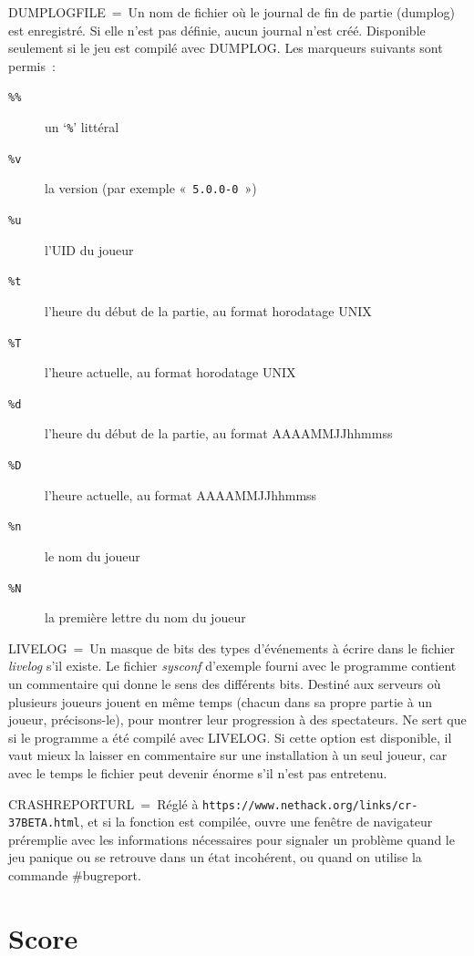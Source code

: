 \documentclass[titlepage]{article}
\begin{document}
DUMPLOGFILE~=~Un nom de fichier où le journal de fin de partie
(dumplog) est enregistré.
Si elle n'est pas définie, aucun journal n'est créé.
Disponible seulement si le jeu est compilé avec DUMPLOG.
Les marqueurs suivants sont permis~:
\begin{description}
\item[{\texttt{\%\%}}]
un `\texttt{\%}' littéral
\item[{\texttt{\%v}}]
la version (par exemple «~\texttt{5.0.0-0}~»)
\item[{\texttt{\%u}}]
l'UID du joueur
\item[{\texttt{\%t}}]
l'heure du début de la partie, au format horodatage UNIX
\item[{\texttt{\%T}}]
l'heure actuelle, au format horodatage UNIX
\item[{\texttt{\%d}}]
l'heure du début de la partie, au format AAAAMMJJhhmmss
\item[{\texttt{\%D}}]
l'heure actuelle, au format AAAAMMJJhhmmss
\item[{\texttt{\%n}}]
le nom du joueur
\item[{\texttt{\%N}}]
la première lettre du nom du joueur
\end{description}


LIVELOG~=~Un masque de bits des types d'événements à écrire dans le
fichier \textit{livelog} s'il existe.
Le fichier \textit{sysconf} d'exemple fourni avec le programme contient un
commentaire qui donne le sens des différents bits.
Destiné aux serveurs où plusieurs joueurs jouent en même temps (chacun
dans sa propre partie à un joueur, précisons-le), pour montrer leur
progression à des spectateurs.
Ne sert que si le programme a été compilé avec LIVELOG.
Si cette option est disponible, il vaut mieux la laisser en commentaire
sur une installation à un seul joueur, car avec le temps le fichier peut
devenir énorme s'il n'est pas entretenu.


CRASHREPORTURL~=~Réglé à
\texttt{https://www.nethack.org/links/cr-37BETA.html},
et si la fonction est compilée, ouvre une fenêtre de navigateur
préremplie avec les informations nécessaires pour signaler un problème
quand le jeu panique ou se retrouve dans un état incohérent, ou quand on
utilise la commande \#bugreport.

\section{Score}
\end{document}

